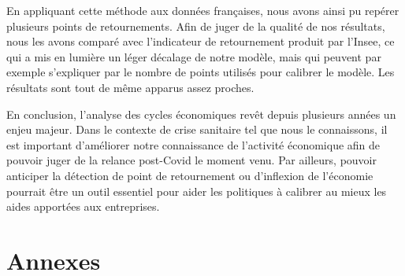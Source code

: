 \documentclass[10pt,french,french]{article}
\begin{document}
En appliquant cette méthode aux données françaises, nous avons ainsi pu repérer plusieurs points de retournements. Afin de juger de la qualité de nos résultats, nous les avons comparé avec l'indicateur de retournement produit par l'Insee, ce qui a mis en lumière un léger décalage de notre modèle, mais qui peuvent par exemple s'expliquer par le nombre de points utilisés pour calibrer le modèle. Les résultats sont tout de même apparus assez proches.

En conclusion, l'analyse des cycles économiques revêt depuis plusieurs années un enjeu majeur. Dans le contexte de crise sanitaire tel que nous le connaissons, il est important d'améliorer notre connaissance de l'activité économique afin de pouvoir juger de la relance post-Covid le moment venu. Par ailleurs, pouvoir anticiper la détection de point de retournement ou d'inflexion de l'économie pourrait être un outil essentiel pour aider les politiques à calibrer au mieux les aides apportées aux entreprises.

\newpage

\hypertarget{annexes}{%
\section{Annexes}\label{annexes}}
\end{document}
